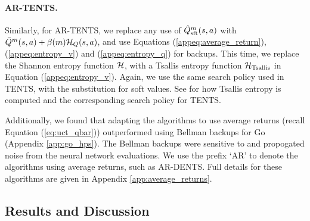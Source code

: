             \paragraph{AR-TENTS.} Similarly, for AR-TENTS, we replace any use of $\hat{Q}^m_{\textnormal{sft}}(s,a)$ with $\bar{Q}^m(s,a)+\beta(m)\mathcal{H}_Q(s,a)$, and use Equations (\ref{appeq:average_return}), (\ref{appeq:entropy_v}) and (\ref{appeq:entropy_q}) for backups. This time, we replace the Shannon entropy function $\mathcal{H}$, with a Tsallis entropy function $\mathcal{H}_{\textnormal{Tsallis}}$ in Equation (\ref{appeq:entropy_v}). Again, we use the same search policy used in TENTS, with the substitution for soft values. See %
             for how Tsallis entropy is computed and the corresponding search policy for TENTS. 


            Additionally, we found that adapting the algorithms to use average returns (recall Equation (\ref{eq:uct_qbar})) outperformed using Bellman backups for Go (Appendix \ref{app:go_hps}). The Bellman backups were sensitive to and propogated noise from the neural network evaluations. We use the prefix `AR' to denote the algorithms using average returns, such as AR-DENTS. Full details for these algorithms are given in Appendix \ref{app:average_returns}.





    \subsection{Results and Discussion}


